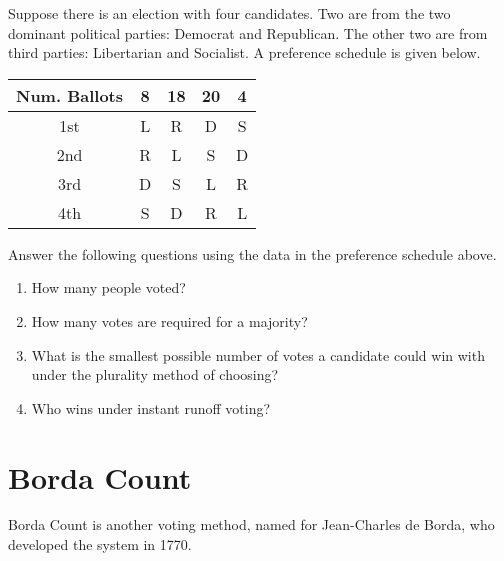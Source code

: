 \begin{exercise}
  Suppose there is an election with four candidates. Two are from the
  two dominant political parties: Democrat and Republican. The other
  two are from third parties: Libertarian and Socialist. A preference
  schedule is given below.
  \begin{center}
    \begin{tabular}{ccccc}
      \toprule
      Num. Ballots & 8 & 18 & 20 & 4 \\
      \midrule
      1st & L & R & D & S \\
      2nd & R & L & S & D \\
      3rd & D & S & L & R \\
      4th & S & D & R & L \\
      \bottomrule
    \end{tabular}
  \end{center}
  Answer the following questions using the data in the preference
  schedule above.
  \begin{enumerate}
  \item How many people voted?


  \item How many votes are required for a majority?


  \item What is the smallest possible number of votes a candidate
    could win with under the plurality method of choosing?



  \item Who wins under instant runoff voting?

  \end{enumerate}
\end{exercise}

\newpage

\section{Borda Count}%
\label{sec:borda-count}

Borda Count is another voting method, named for Jean-Charles de Borda,
who developed the system in 1770.

